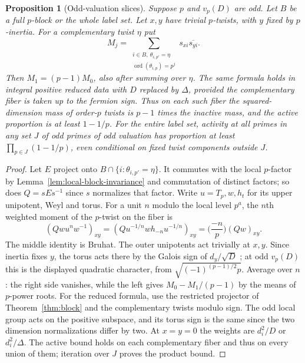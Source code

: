 \documentclass[11pt,a4paper]{article}
\numberwithin{equation}{section}
\newtheorem{proposition}[theorem]{Proposition}
\theoremstyle{remark}
\DeclareMathOperator{\ord}{ord}
\begin{document}
\begin{proposition}[Odd-valuation slices]\label{fam:M:3.8}\label{prop:blockwise-odd-slice}\label{prop:odd-slice}
Suppose $p$ and $v_p(D)$ are odd. Let $B$ be a full $p$-block or the whole label set. Let $x,y$ have trivial $p$-twists, with $y$ fixed by $p$-inertia. For a complementary twist $\eta$ put
\[
 M_j=\sum_{\substack{i\in B,\ \theta_{i,p'}=\eta\\
                 \ord(\theta_{i,p})=p^j}}s_{xi}\overline{s_{yi}}.
\]
Then $M_1=(p-1)M_0$, also after summing over $\eta$. The same formula
holds in integral positive reduced data with $D$ replaced by $\Delta$,
provided the complementary fiber is taken up to the fermion sign. Thus on each such fiber the squared-dimension mass of order-$p$ twists is $p-1$ times the inactive mass, and the active proportion is at least $1-1/p$. For the entire label set, activity at all primes in any set $J$ of odd primes of odd valuation has proportion at least $\prod_{p\in J}(1-1/p)$, even conditional on fixed twist components outside $J$.
\end{proposition}
\begin{proof}
Let $E$ project onto $B\cap\{i:\theta_{i,p'}=\eta\}$. It commutes with the local $p$-factor by Lemma~\ref{lem:local-block-invariance} and commutation of distinct factors; so does $Q=sEs^{-1}$ since $s$ normalizes that factor. Write $u=T_p,w,h_t$ for its upper unipotent, Weyl and torus. For a unit $n$ modulo the local level $p^a$, the $n$th weighted moment of the $p$-twist on the fiber is
\[
 (Qwu^nw^{-1})_{xy}=(Qu^{-1/n}wh_{-n}u^{-1/n})_{xy}
 =\Big(\frac{-n}{p}\Big)(Qw)_{xy}.
\]
The middle identity is Bruhat. The outer unipotents act trivially at $x,y$. Since inertia fixes $y$, the torus acts there by the Galois sign of $d_y/\sqrt D$ \cite[Theorem~II and Remark~4.5]{DLNCongruence}; at odd $v_p(D)$ this is the displayed quadratic character, from $\sqrt{(-1)^{(p-1)/2}p}$. Average over $n$: the right side vanishes, while the left gives $M_0-M_1/(p-1)$ by the means of $p$-power roots. For the reduced formula, use the restricted projector of
Theorem~\ref{thm:block} and the complementary twists modulo sign.
The odd local group acts on the positive subspace, and its torus sign
is the same since the two dimension normalizations differ by two.
At $x=y=0$ the weights are $d_i^2/D$ or $d_i^2/\Delta$. The active bound holds on each complementary fiber and thus on every union of them; iteration over $J$ proves the product bound.
\end{proof}
\end{document}
